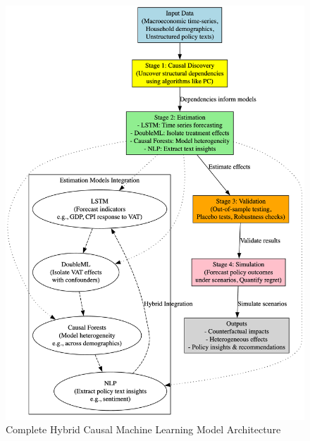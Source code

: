 \begin{figure}[htbp]
    \centering
    \includegraphics[width=\textwidth]{exports/methodology.png}
    \caption{Complete Hybrid Causal Machine Learning Model Architecture}
    \label{fig:complete_methodology}
\end{figure}

